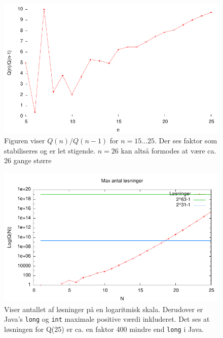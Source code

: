 \documentclass[draft,a4paper,11pt]{article}
\begin{document}
\begin{figure}[h!]
\begin{center}
\includegraphics{../benchmarks/resultatstorrelse.pdf}
\caption{Figuren viser $Q(n)/Q(n-1)$ for $n=15\ldots25$. Der ses faktor som stabiliseres og er let stigende. $n=26$ kan altså formodes at være ca. 26 gange større}
\label{figur:loesningfaktor}
\end{center}
\end{figure}

\begin{figure}[h!]
\begin{center}
\includegraphics{../benchmarks/maxantal.pdf}
\caption{Viser antallet af løsninger på en logaritmisk skala. Derudover er Java's \texttt{long} og \texttt{int} maximale positive værdi inkluderet. Det ses at løsningen for Q(25) er ca. en faktor 400 mindre end \texttt{long} i Java.}
\label{figur:maxantal}
\end{center}
\end{figure}
\end{document}
